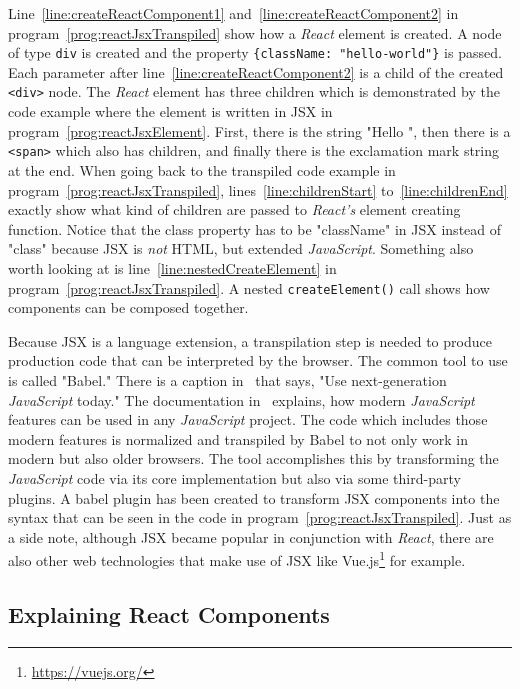 Line~\ref{line:createReactComponent1} and~\ref{line:createReactComponent2} in program~\ref{prog:reactJsxTranspiled} show how a \emph{React} element is created. A node of type \texttt{div} is created and the property \texttt{\{className: "hello-world"\}} is passed. Each parameter after line~\ref{line:createReactComponent2} is a child of the created \texttt{<div>} node. The \emph{React} element has three children which is demonstrated by the code example where the element is written in JSX in program~\ref{prog:reactJsxElement}. First, there is the string "Hello ", then there is a \texttt{<span>} which also has children, and finally there is the exclamation mark string at the end. When going back to the transpiled code example in program~\ref{prog:reactJsxTranspiled}, lines~\ref{line:childrenStart} to~\ref{line:childrenEnd} exactly show what kind of children are passed to \emph{React's} element creating function. Notice that the class property has to be "className" in JSX instead of "class" because JSX is \emph{not} HTML, but extended \emph{JavaScript}. Something also worth looking at is line~\ref{line:nestedCreateElement} in program~\ref{prog:reactJsxTranspiled}. A nested \texttt{createElement()} call shows how components can be composed together.

Because JSX is a language extension, a transpilation step is needed to produce production code that can be interpreted by the browser. The common tool to use is called "Babel." There is a caption in~\cite{Babel} that says, "Use next-generation \emph{JavaScript} today." The documentation in~\cite{Babel} explains, how modern \emph{JavaScript} features can be used in any \emph{JavaScript} project. The code which includes those modern features is normalized and transpiled by Babel to not only work in modern but also older browsers. The tool accomplishes this by transforming the \emph{JavaScript} code via its core implementation but also via some third-party plugins. A babel plugin has been created to transform JSX components into the syntax that can be seen in the code in program~\ref{prog:reactJsxTranspiled}. Just as a side note, although JSX became popular in conjunction with \emph{React}, there are also other web technologies that make use of JSX like Vue.js\footnote{\url{https://vuejs.org/}} for example.

\subsection{Explaining React Components}
\label{sec:reactComponents}

